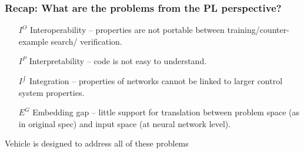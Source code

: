 \documentclass[t,compress,aspectratio=169]{beamer}
\begin{document}
\begin{frame}
\frametitle{Recap: What are the problems from the PL perspective?}

\pause
\begin{itemize}
\item[$I^O$] Interoperability -- properties are not portable between training/counter-example search/ verification.
\pause
\item[$I^{P}$] Interpretability -- code is not easy to understand.
\pause
\item[$I^{\int}$] Integration -- properties of networks cannot be linked to larger control system properties.
\pause
\item[$E^G$] Embedding gap -- little support for translation between problem space (as in original spec) and input space (at neural network level).
\end{itemize}

\vspace{1em}
\pause

\alert{Vehicle is designed to address all of these problems}
\end{frame}
\end{document}
